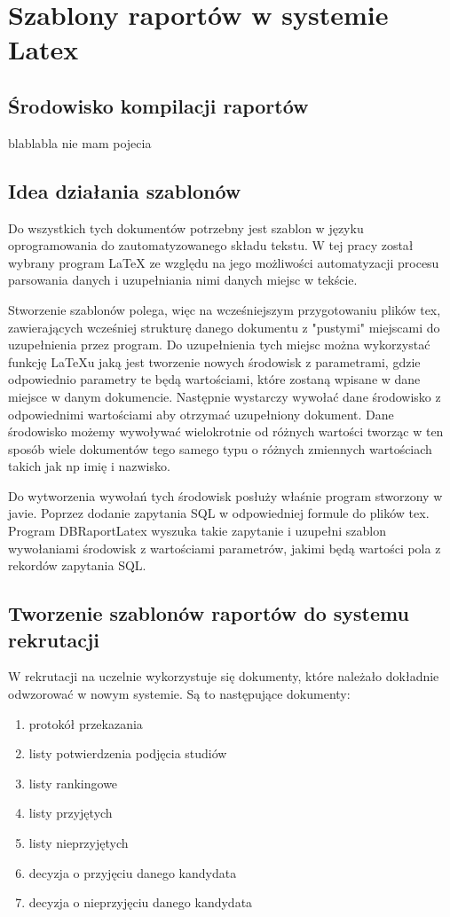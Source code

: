 \chapter{Szablony raportów w systemie Latex}
\label{ch:szablonyraportowwsystemielatex}
\section{Środowisko kompilacji raportów}

blablabla nie mam pojecia

\section{Idea działania szablonów}

Do wszystkich tych dokumentów potrzebny jest szablon w języku oprogramowania do zautomatyzowanego składu tekstu. W tej pracy został wybrany program LaTeX ze względu na jego możliwości automatyzacji procesu parsowania danych i uzupełniania nimi danych miejsc w tekście.
\par Stworzenie szablonów polega, więc na wcześniejszym przygotowaniu plików tex, zawierających wcześniej strukturę danego dokumentu z "pustymi" miejscami do uzupełnienia przez program. Do uzupełnienia tych miejsc można wykorzystać funkcję LaTeXu jaką jest tworzenie nowych środowisk z parametrami, gdzie odpowiednio parametry te będą wartościami, które zostaną wpisane w dane miejsce w danym dokumencie. Następnie wystarczy wywołać dane środowisko z odpowiednimi wartościami aby otrzymać uzupełniony dokument. Dane środowisko możemy wywoływać wielokrotnie od różnych wartości tworząc w ten sposób wiele dokumentów tego samego typu o różnych zmiennych wartościach takich jak np imię i nazwisko. 
\par Do wytworzenia wywołań tych środowisk posłuży właśnie program stworzony w javie. Poprzez dodanie zapytania SQL w odpowiedniej formule do plików tex. Program DBRaportLatex wyszuka takie zapytanie i uzupełni szablon wywołaniami środowisk z wartościami parametrów, jakimi będą wartości pola z rekordów zapytania SQL. 




\section{Tworzenie szablonów raportów do systemu rekrutacji}

W rekrutacji na uczelnie wykorzystuje się dokumenty, które należało dokładnie odwzorować w nowym systemie. Są to następujące dokumenty:
\begin{enumerate}
\item protokół przekazania
\item listy potwierdzenia podjęcia studiów 
\item listy rankingowe 
\item listy przyjętych
\item listy nieprzyjętych
\item decyzja o przyjęciu danego kandydata
\item decyzja o nieprzyjęciu danego kandydata
\end{enumerate}

